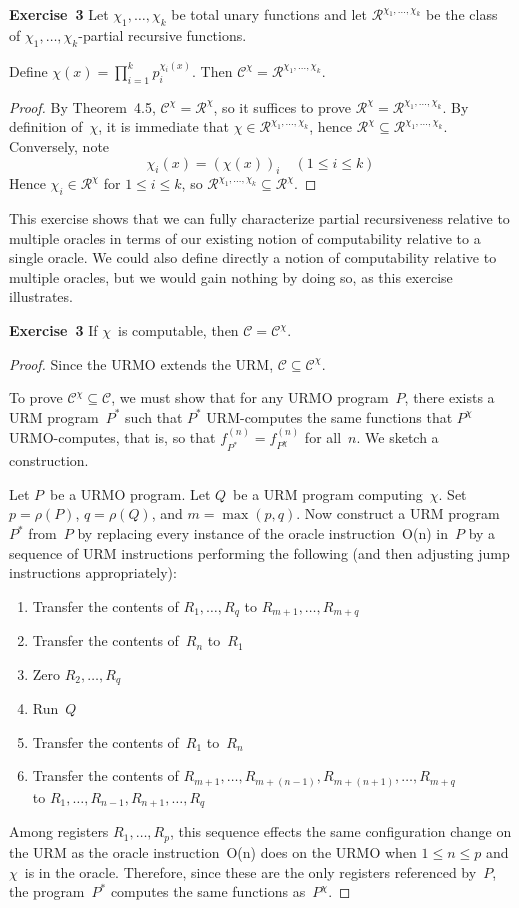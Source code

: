 \documentclass[letterpaper]{article}
\newcommand{\exercise}[2][]{\noindent\textbf{Exercise~{#2}}\ifthenelse{\isempty{#1}}{\textbf{.}}{ ({#1})\textbf{.}}}
\newcommand{\C}{\mathcal{C}}
\newcommand{\PAR}{\mathcal{R}}
\theoremstyle{plain}
\theoremstyle{definition}
\theoremstyle{remark}
\begin{document}
\exercise{3}
Let $\chi_1,\ldots,\chi_k$ be total unary functions and let $\PAR^{\chi_1,\ldots,\chi_k}$ be the class of $\chi_1,\ldots,\chi_k$-partial recursive functions.

Define $\chi(x)=\prod_{i=1}^k p_i^{\chi_i(x)}$. Then $\C^{\chi}=\PAR^{\chi_1,\ldots,\chi_k}$.
\begin{proof}
By Theorem~4.5, $\C^\chi=\PAR^\chi$, so it suffices to prove $\PAR^\chi=\PAR^{\chi_1,\ldots,\chi_k}$. By definition of~$\chi$, it is immediate that $\chi\in\PAR^{\chi_1,\ldots,\chi_k}$, hence $\PAR^\chi\subseteq\PAR^{\chi_1,\ldots,\chi_k}$. Conversely, note
$$\chi_i(x)=(\chi(x))_i\quad(1\le i\le k)$$
Hence $\chi_i\in\PAR^\chi$ for $1\le i\le k$, so $\PAR^{\chi_1,\ldots,\chi_k}\subseteq\PAR^\chi$.
\end{proof}
\noindent This exercise shows that we can fully characterize partial recursiveness relative to multiple oracles in terms of our existing notion of computability relative to a single oracle. We could also define directly a notion of computability relative to multiple oracles, but we would gain nothing by doing so, as this exercise illustrates.

\bigskip
\exercise{3}
If $\chi$~is computable, then $\C=\C^\chi$.
\begin{proof}
Since the URMO extends the URM, $\C\subseteq\C^\chi$.

To prove $\C^\chi\subseteq\C$, we must show that for any URMO program~$P$, there exists a URM program~$P^*$ such that $P^*$ URM-computes the same functions that $P^\chi$ URMO-computes, that is, so that $f_{P^*}^{(n)}=f_{P^\chi}^{(n)}$ for all~$n$. We sketch a construction.

Let $P$~be a URMO program. Let $Q$~be a URM program computing~$\chi$. Set $p=\rho(P)$, $q=\rho(Q)$, and $m=\max(p,q)$. Now construct a URM program~$P^*$ from~$P$ by replacing every instance of the oracle instruction~O(n) in~$P$ by a sequence of URM instructions performing the following (and then adjusting jump instructions appropriately):
\begin{enumerate}[itemsep=0pt]
\item Transfer the contents of $R_1,\ldots,R_q$ to $R_{m+1},\ldots,R_{m+q}$
\item Transfer the contents of~$R_n$ to~$R_1$
\item Zero $R_2,\ldots,R_q$
\item Run~$Q$
\item Transfer the contents of~$R_1$ to~$R_n$
\item Transfer the contents of $R_{m+1},\ldots,R_{m+(n-1)},R_{m+(n+1)},\ldots,R_{m+q}$\\
to $R_1,\ldots,R_{n-1},R_{n+1},\ldots,R_q$
\end{enumerate}
Among registers $R_1,\ldots,R_p$, this sequence effects the same configuration change on the URM as the oracle instruction~O(n) does on the URMO when $1\le n\le p$ and $\chi$~is in the oracle. Therefore, since these are the only registers referenced by~$P$, the program~$P^*$ computes the same functions as~$P^\chi$.
\end{proof}
\end{document}
